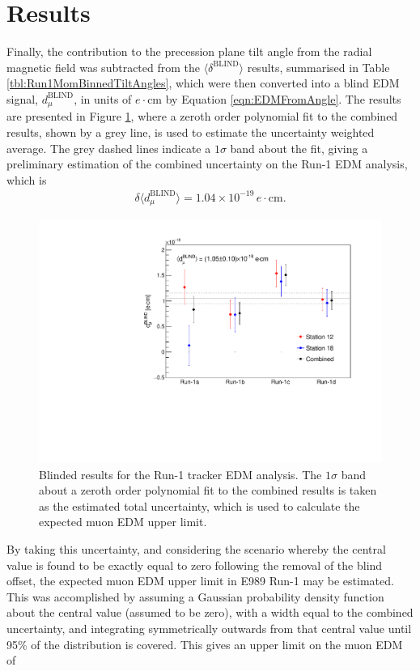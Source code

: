 \section{Results}\label{sec:EDMResults}

Finally, the contribution to the precession plane tilt angle from the radial magnetic field was subtracted from the $\langle \delta^{\text{BLIND}} \rangle$ results, summarised in Table \ref{tbl:Run1MomBinnedTiltAngles}, which were then converted into a blind EDM signal, $d_{\mu}^{\text{BLIND}}$, in units of $e\cdot$cm by Equation \ref{eqn:EDMFromAngle}. The results are presented in Figure \ref{fig:MainResult}, where a zeroth order polynomial fit to the combined results, shown by a grey line, is used to estimate the uncertainty weighted average. The grey dashed lines indicate a $1\sigma$ band about the fit, giving a preliminary estimation of the combined uncertainty on the Run-1 EDM analysis, which is     
%
\begin{align*}
  \delta \langle d_{\mu}^{\text{BLIND}} \rangle = 1.04\times10^{-19} \,e\cdot\text{cm}.
\end{align*}
%
\begin{figure}[b!]
\centering{}
\includegraphics[trim={0 0 0 0},clip,width=.89\textwidth]{Images/Chapter6/EDM_vs_DS_blinded_1000_2500MeV_250MeV_randomised_BQ.pdf}
\caption{Blinded results for the Run-1 tracker EDM analysis. The $1\sigma$ band about a zeroth order polynomial fit to the combined results is taken as the estimated total uncertainty, which is used to calculate the expected muon EDM upper limit.}
\label{fig:MainResult}
\end{figure} 
%
By taking this uncertainty, and considering the scenario whereby the central value is found to be exactly equal to zero following the removal of the blind offset, the expected muon EDM upper limit in E989 Run-1 may be estimated. This was accomplished by assuming a Gaussian probability density function about the central value (assumed to be zero), with a width equal to the combined uncertainty, and integrating symmetrically outwards from that central value until 95\% of the distribution is covered. This gives an upper limit on the muon EDM of
